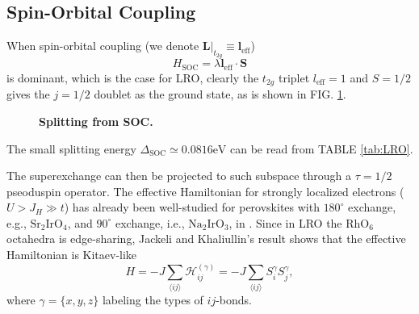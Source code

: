 \documentclass[10pt,nofootinbib,letterpaper]{revtex4}
\begin{document}
	\subsection{Spin-Orbital Coupling}
		When spin-orbital coupling (we denote $\bm{L}|_{t_{2g}}\equiv\bm{l}_{\text{eff}}$)
		\begin{equation}\label{1.2.1}
			H_{\text{SOC}}=\lambda\bm{l}_{\text{eff}}\cdot\bm{S}
		\end{equation}
		is dominant, which is the case for LRO, clearly the $t_{2g}$ triplet $l_{\text{eff}}=1$ and $S=1/2$ gives the $j=1/2$ doublet as the ground state, as is shown in FIG. \ref{fig:t2g-SOC}.
		\begin{figure}[!htp]
			\centering
			\caption{\bf Splitting from SOC.}
			\label{fig:t2g-SOC}
		\end{figure}
		The small splitting energy $\Delta_{\text{SOC}}\simeq0.0816\mathrm{eV}$ can be read from TABLE \ref{tab:LRO}.\par
		The superexchange can then be projected to such subspace through a $\tau=1/2$ pseoduspin operator. The effective Hamiltonian for strongly localized electrons ($U>J_H\gg t$) has already been well-studied for perovskites with $180^\circ$ exchange, e.g., $\mathrm{Sr}_2\mathrm{IrO}_4$, and $90^\circ$ exchange, i.e., $\mathrm{Na}_2\mathrm{IrO}_3$, in \cite{jackeli2009mott}. Since in LRO the $\mathrm{RhO}_6$ octahedra is edge-sharing, Jackeli and Khaliullin's result shows that the effective Hamiltonian is Kitaev-like \cite{kitaev2006anyons}
		\begin{equation}\label{1.2.2}
			H=-J\sum_{\langle ij \rangle }\mathcal{H}^{(\gamma)}_{ij}=-J\sum_{\langle ij \rangle}S_i^\gamma S_j^\gamma,
		\end{equation}
		where $\gamma=\{x,y,z\}$ labeling the types of $ij$-bonds.
\end{document}
